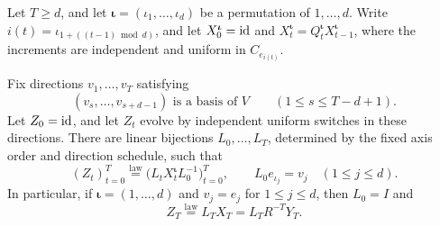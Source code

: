 \begin{lemma}
\label{lem:frames}\label{shear:lem:general-frame}
Let $T\ge d$, and let $\boldsymbol\iota=(\iota_1,\ldots,\iota_d)$
be a permutation of $1,\ldots,d$. Write
$i(t)=\iota_{1+((t-1)\bmod d)}$, and let
$X^{\boldsymbol\iota}_0=\mathrm{id}$ and
$X^{\boldsymbol\iota}_t=Q^{\boldsymbol\iota}_t
 X^{\boldsymbol\iota}_{t-1}$, where the increments are independent
and uniform in $C_{e_{i(t)}}$.

Fix directions $v_1,\ldots,v_T$ satisfying
\begin{equation}\label{eq:frames:bases}
 (v_s,\ldots,v_{s+d-1})\text{ is a basis of }V
 \qquad(1\le s\le T-d+1).
\end{equation}
Let $Z_0=\mathrm{id}$, and let $Z_t$ evolve by independent uniform switches
in these directions. There are linear bijections $L_0,\ldots,L_T$,
determined by the fixed axis order and direction schedule, such that
\begin{equation}\label{shear:eq:general-frame}
 (Z_t)_{t=0}^T\overset{\mathrm{law}}=
 \bigl(L_tX^{\boldsymbol\iota}_tL_0^{-1}\bigr)_{t=0}^T,
 \qquad L_0e_{\iota_j}=v_j\quad(1\le j\le d).
\end{equation}
In particular, if $\boldsymbol\iota=(1,\ldots,d)$ and $v_j=e_j$
for $1\le j\le d$, then $L_0=I$ and
\begin{equation}\label{eq:frames:endpoint}
 Z_T\overset{\mathrm{law}}=L_TX_T=L_TR^{-T}Y_T.
\end{equation}
\end{lemma}


